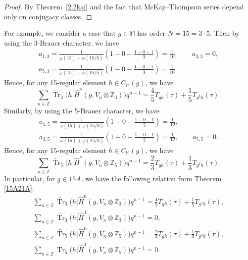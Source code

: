 \documentclass[10pt,a4paper]{amsart}
\numberwithin{equation}{section}
\begin{document}
\begin{proof}
By Theorem~\ref{2.2kai} and the fact that McKay--Thompson series depend only on conjugacy classes.
\end{proof}

For example, we consider a case that $g\in \mathbb{M}$ has order $N=15=3\cdot 5$. Then by using the 3-Brauer character, we have \begin{gather*}
a_{1,3}=\frac{1}{\varphi(15)+\varphi(15/5)}\left(1-0-\frac{1-0-1}{3}\right)=\frac{1}{10}, \qquad a_{3,3}=0, \\ a_{5,3}=\frac{1}{\varphi(15)+\varphi(15/5)}\left(1-0-\frac{1-0-1}{3}\right)=\frac{1}{10}.
\end{gather*} Hence, for any 15-regular element $h\in C_{\mathbb{M}}(g)$, we have
\[
\sum_{n\in \mathbb{Z}}\widetilde{\operatorname{Tr}}_3\big(h|\hat{H}^*(g,V_n\otimes \mathbb{Z}_3)\big)q^{n-1}= \frac{4}{5}T_{gh}(\tau)+\frac{1}{5}T_{g^5h}(\tau).
\]
Similarly, by using the 5-Brauer character, we have
\begin{gather*}
a_{1,5}=\frac{1}{\varphi(15)+\varphi(15/3)}\left(1-0-\frac{1-0-1}{5}\right)=\frac{1}{12},\\
 a_{3,5}=\frac{1}{\varphi(15)+\varphi(15/3)}\left(1-0-\frac{1-0-1}{5}\right)=\frac{1}{12}, \qquad a_{5,5}=0.
\end{gather*}
 Hence, for any 15-regular element $h\in C_{\mathbb{M}}(g)$, we have
\[
\sum_{n\in \mathbb{Z}}\widetilde{\operatorname{Tr}}_5\big(h|\hat{H}^*(g,V_n\otimes \mathbb{Z}_5)\big)q^{n-1}
= \frac{2}{3}T_{gh}(\tau)+\frac{1}{3}T_{g^3h}(\tau).
\]
In particular, for $g\in 15A$, we have the following relation from Theorem \ref{15A21A}:
\begin{gather*}
\sum_{n\in \mathbb{Z}}\widetilde{\operatorname{Tr}}_3\big(h|\hat{H}^0(g,V_n\otimes \mathbb{Z}_3)\big)q^{n-1}= \frac{4}{5}T_{gh}(\tau)+\frac{1}{5}T_{g^5h}(\tau),\\
\sum_{n\in \mathbb{Z}}\widetilde{\operatorname{Tr}}_3\big(h|\hat{H}^1(g,V_n\otimes \mathbb{Z}_3)\big)q^{n-1}=0,\\
\sum_{n\in \mathbb{Z}}\widetilde{\operatorname{Tr}}_5\big(h|\hat{H}^0(g,V_n\otimes \mathbb{Z}_5)\big)q^{n-1}= \frac{2}{3}T_{gh}(\tau)+\frac{1}{3}T_{g^3h}(\tau),\\
\sum_{n\in \mathbb{Z}}\widetilde{\operatorname{Tr}}_5\big(h|\hat{H}^1(g,V_n\otimes \mathbb{Z}_5)\big)q^{n-1}= 0.
\end{gather*}
\end{document}
